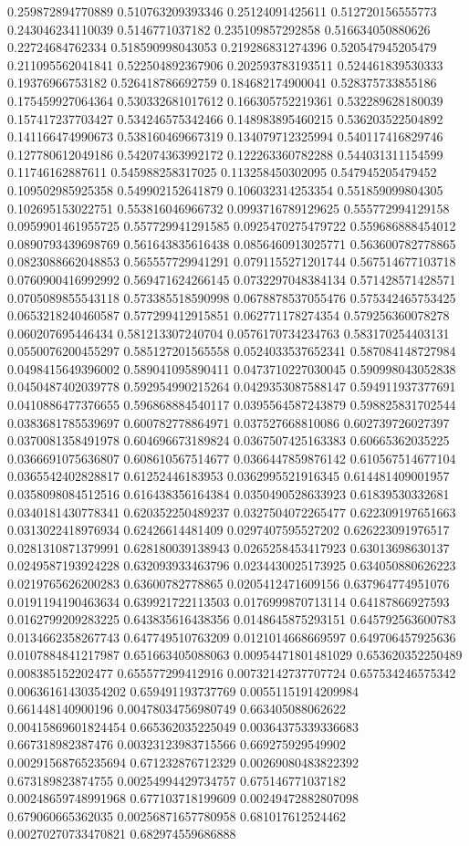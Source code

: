 \begin{table}
\begin{tabu}
\begin{sparkline}{10}
0.259872894770889 0.510763209393346 0.25124091425611 0.512720156555773 0.243046234110039 0.5146771037182 0.235109857292858 0.516634050880626 0.22724684762334 0.518590998043053 0.219286831274396 0.520547945205479 0.211095562041841 0.522504892367906 0.202593783193511 0.524461839530333 0.19376966753182 0.526418786692759 0.184682174900041 0.528375733855186 0.175459927064364 0.530332681017612 0.166305752219361 0.532289628180039 0.157417237703427 0.534246575342466 0.148983895460215 0.536203522504892 0.141166474990673 0.538160469667319 0.134079712325994 0.540117416829746 0.127780612049186 0.542074363992172 0.122263360782288 0.544031311154599 0.11746162887611 0.545988258317025 0.113258450302095 0.547945205479452 0.109502985925358 0.549902152641879 0.106032314253354 0.551859099804305 0.102695153022751 0.553816046966732 0.0993716789129625 0.555772994129158 0.0959901461955725 0.557729941291585 0.0925470275479722 0.559686888454012 0.0890793439698769 0.561643835616438 0.0856460913025771 0.563600782778865 0.0823088662048853 0.565557729941291 0.0791155271201744 0.567514677103718 0.0760900416992992 0.569471624266145 0.0732297048384134 0.571428571428571 0.0705089855543118 0.573385518590998 0.0678878537055476 0.575342465753425 0.0653218240460587 0.577299412915851 0.062771178274354 0.579256360078278 0.060207695446434 0.581213307240704 0.0576170734234763 0.583170254403131 0.0550076200455297 0.585127201565558 0.0524033537652341 0.587084148727984 0.0498415649396002 0.589041095890411 0.0473710227030045 0.590998043052838 0.0450487402039778 0.592954990215264 0.0429353087588147 0.594911937377691 0.0410886477376655 0.596868884540117 0.0395564587243879 0.598825831702544 0.0383681785539697 0.600782778864971 0.037527668810086 0.602739726027397 0.0370081358491978 0.604696673189824 0.0367507425163383 0.60665362035225 0.0366691075636807 0.608610567514677 0.0366447859876142 0.610567514677104 0.0365542402828817 0.61252446183953 0.0362995521916345 0.614481409001957 0.0358098084512516 0.616438356164384 0.0350490528633923 0.61839530332681 0.0340181430778341 0.620352250489237 0.0327504072265477 0.622309197651663 0.0313022418976934 0.62426614481409 0.0297407595527202 0.626223091976517 0.0281310871379991 0.628180039138943 0.0265258453417923 0.63013698630137 0.0249587193924228 0.632093933463796 0.0234430025173925 0.634050880626223 0.0219765626200283 0.63600782778865 0.0205412471609156 0.637964774951076 0.0191194190463634 0.639921722113503 0.0176999870713114 0.64187866927593 0.0162799209283225 0.643835616438356 0.0148645875293151 0.645792563600783 0.0134662358267743 0.647749510763209 0.0121014668669597 0.649706457925636 0.0107884841217987 0.651663405088063 0.00954471801481029 0.653620352250489 0.008385152202477 0.655577299412916 0.00732142737707724 0.657534246575342 0.00636161430354202 0.659491193737769 0.00551151914209984 0.661448140900196 0.00478034756980749 0.663405088062622 0.00415869601824454 0.665362035225049 0.00364375339336683 0.667318982387476 0.00323123983715566 0.669275929549902 0.00291568765235694 0.671232876712329 0.00269080483822392 0.673189823874755 0.00254994429734757 0.675146771037182 0.00248659748991968 0.677103718199609 0.00249472882807098 0.679060665362035 0.00256871657780958 0.681017612524462 0.00270270733470821 0.682974559686888 
\end{sparkline}
\end{tabu}
\end{table}
